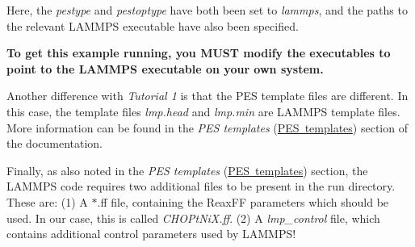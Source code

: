 \begin{DoxyItemize}
\item Here, the {\itshape pestype} and {\itshape pestoptype} have both been set to {\itshape lammps}, and the paths to the relevant L\+A\+M\+M\+PS executable have also been specified.
\item {\bfseries{To get this example running, you M\+U\+ST modify the executables to point to the L\+A\+M\+M\+PS executable on your own system.}}
\item Another difference with {\itshape Tutorial 1} is that the P\+ES template files are different. In this case, the template files {\itshape lmp.\+head} and {\itshape lmp.\+min} are L\+A\+M\+M\+PS template files. More information can be found in the {\itshape P\+ES templates} (\mbox{\hyperlink{_templates}{P\+ES templates}}) section of the documentation.
\item Finally, as also noted in the {\itshape P\+ES templates} (\mbox{\hyperlink{_templates}{P\+ES templates}}) section, the L\+A\+M\+M\+PS code requires two additional files to be present in the run directory. These are\+: (1) A $\ast$.ff file, containing the Reax\+FF parameters which should be used. In our case, this is called {\itshape C\+H\+O\+Pt\+Ni\+X.\+ff}. (2) A {\itshape lmp\+\_\+control} file, which contains additional control parameters used by L\+A\+M\+M\+P\+S! 
\end{DoxyItemize}
